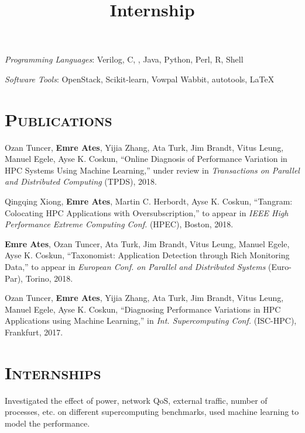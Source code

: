 \begin{resume}
	\emph{Programming Languages}: Verilog, C, \Cplusplus, Java, Python, Perl, R,
  Shell
	\setlength{\parskip}{1mm}
	
	\emph{Software Tools}: OpenStack, Scikit-learn, Vowpal Wabbit, autotools, \LaTeX
	
	
	

  \section{\textsc{Publications}}
  Ozan Tuncer, \textbf{Emre Ates}, Yijia Zhang, Ata Turk, Jim Brandt, Vitus
  Leung, Manuel Egele, Ayse K. Coskun, ``Online Diagnosis of Performance
  Variation in HPC Systems Using Machine Learning,'' under review in
  \textit{Transactions on Parallel and Distributed Computing} (TPDS), 2018.

  Qingqing Xiong, \textbf{Emre Ates}, Martin C. Herbordt, Ayse K. Coskun,
  ``Tangram: Colocating HPC Applications with Oversubscription,'' to appear in
  \textit{IEEE High Performance Extreme Computing Conf.} (HPEC), Boston, 2018.

  \textbf{Emre Ates}, Ozan Tuncer, Ata Turk, Jim Brandt, Vitus Leung, Manuel
  Egele, Ayse K. Coskun, ``Taxonomist: Application Detection through Rich
  Monitoring Data,'' to appear in \textit{European Conf. on Parallel and
    Distributed Systems} (Euro-Par), Torino, 2018.

  Ozan Tuncer, \textbf{Emre Ates}, Yijia Zhang, Ata Turk, Jim Brandt, Vitus
  Leung, Manuel Egele, Ayse K. Coskun, ``Diagnosing Performance Variations in
  HPC Applications using Machine Learning,'' in \textit{Int. Supercomputing
    Conf.} (ISC-HPC), Frankfurt, 2017.
	
	\section{\textsc{Internships}}
	
	\title{Internship}
	\begin{position}
    Investigated the effect of power, network QoS, external traffic, number of
    processes, etc. on different supercomputing benchmarks, used machine
    learning to model the performance.
	\end{position}
	

\end{resume}
